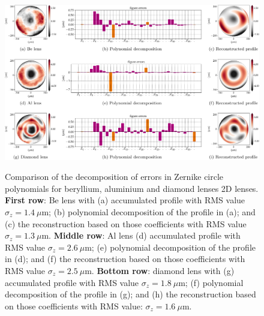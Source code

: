 \begin{refsection}
\begin{figure}[t]
        \centering
        {\includegraphics[width=1.\linewidth]{figures/ch04/metrology_zernike_profiles.pdf}}
        \caption[Other sources of deviations from the parabolic shape]{Comparison of the decomposition of errors in Zernike circle polynomials for beryllium, aluminium and diamond lenses 2D lenses. \textbf{First row}: Be lens with (a) accumulated profile with RMS value $\sigma_z=1.4~\mu$m; (b) polynomial decomposition of the profile in (a); and (c) the reconstruction based on those coefficients with RMS value $\sigma_z=1.3~\mu$m. \textbf{Middle row}: Al lens (d) accumulated profile with RMS value $\sigma_z=2.6~\mu$m; (e) polynomial decomposition of the profile in (d); and (f) the reconstruction based on those coefficients with RMS value $\sigma_z=2.5~\mu$m. \textbf{Bottom row}: diamond lens with (g) accumulated profile with RMS value $\sigma_z=1.8~\mu$m; (f) polynomial decomposition of the profile in (g); and (h) the reconstruction based on those coefficients with RMS value: $\sigma_z=1.6~\mu$m.}
        \label{fig:metrology_zernike_profiles}
\end{figure}


\end{refsection}

